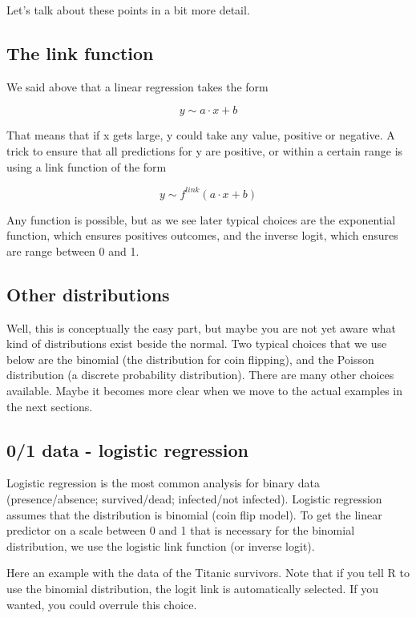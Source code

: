 \documentclass[a4paper,twoside]{tufte-book} %
\begin{document}
Let's talk about these points in a bit more detail.

\subsection{The link function}

We said above that a linear regression takes the form 

\begin{equation}
y \sim a \cdot x + b 
\end{equation}

That means that if x gets large, y could take any value, positive or negative. A trick to ensure that all predictions for y are positive, or within a certain range is using a link function of the form 

\begin{equation}
y \sim f^{link}(a \cdot x + b )
\end{equation}

Any function is possible, but as we see later typical choices are the exponential function, which ensures positives outcomes, and the inverse logit, which ensures are range between 0 and 1.

\subsection{Other distributions}

Well, this is conceptually the easy part, but maybe you are not yet aware what kind of distributions exist beside the normal. Two typical choices that we use below are the binomial (the distribution for coin flipping), and the Poisson distribution (a discrete probability distribution). There are many other choices available. Maybe it becomes more clear when we move to the actual examples in the next sections. 

\subsection{0/1 data - logistic regression}

Logistic regression is the most common analysis for binary data (presence/absence; survived/dead; infected/not infected). Logistic regression assumes that the distribution is binomial (coin flip model). To get the linear predictor on a scale between 0 and 1 that is necessary for the binomial distribution, we use the logistic link function (or inverse logit). 

Here an example with the data of the Titanic survivors. Note that if you tell R to use the binomial distribution, the logit link is automatically selected. If you wanted, you could overrule this choice. 
\end{document}
